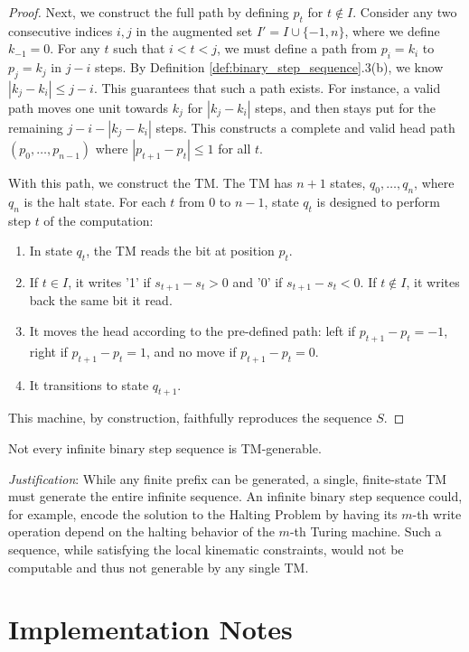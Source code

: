 \begin{lemma}
\begin{proof}
Next, we construct the full path by defining $p_t$ for $t \notin I$. Consider any two consecutive indices $i, j$ in the augmented set $I' = I \cup \{-1, n\}$, where we define $k_{-1} = 0$. For any $t$ such that $i < t < j$, we must define a path from $p_i=k_i$ to $p_j=k_j$ in $j-i$ steps. By Definition \ref{def:binary_step_sequence}.3(b), we know $|k_j - k_i| \leq j-i$. This guarantees that such a path exists. For instance, a valid path moves one unit towards $k_j$ for $|k_j - k_i|$ steps, and then stays put for the remaining $j - i - |k_j - k_i|$ steps. This constructs a complete and valid head path $(p_0, \ldots, p_{n-1})$ where $|p_{t+1} - p_t| \leq 1$ for all $t$.

With this path, we construct the TM. The TM has $n+1$ states, $q_0, \ldots, q_n$, where $q_n$ is the halt state. For each $t$ from $0$ to $n-1$, state $q_t$ is designed to perform step $t$ of the computation:
\begin{enumerate}
\item In state $q_t$, the TM reads the bit at position $p_t$.
\item If $t \in I$, it writes '1' if $s_{t+1} - s_t > 0$ and '0' if $s_{t+1} - s_t < 0$. If $t \notin I$, it writes back the same bit it read.
\item It moves the head according to the pre-defined path: left if $p_{t+1}-p_t = -1$, right if $p_{t+1}-p_t=1$, and no move if $p_{t+1}-p_t=0$.
\item It transitions to state $q_{t+1}$.
\end{enumerate}
This machine, by construction, faithfully reproduces the sequence $S$.
\end{proof}

\begin{conjecture}
Not every infinite binary step sequence is TM-generable.
\end{conjecture}

\emph{Justification}: While any finite prefix can be generated, a single, finite-state TM must generate the entire infinite sequence. An infinite binary step sequence could, for example, encode the solution to the Halting Problem by having its $m$-th write operation depend on the halting behavior of the $m$-th Turing machine. Such a sequence, while satisfying the local kinematic constraints, would not be computable and thus not generable by any single TM.

\chapter{Implementation Notes}


\end{lemma}
